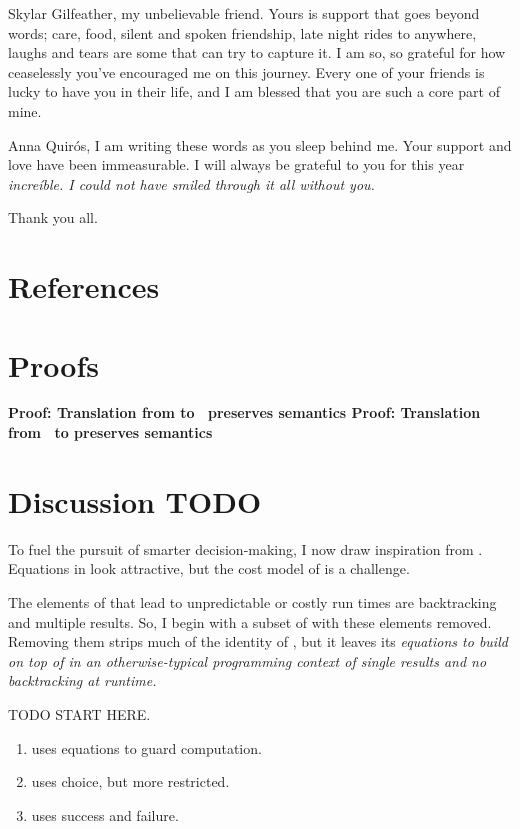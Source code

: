 \documentclass[manuscript,screen,review, 12pt, nonacm]{acmart}
\begin{document}
Skylar Gilfeather, my unbelievable friend. Yours is support that goes
beyond words; care, food, silent and spoken friendship, late night rides to
anywhere, laughs and tears are some that can try to capture it. I am so, so
grateful for how ceaselessly you've encouraged me on this journey. Every one
of your friends is lucky to have you in their life, and I am blessed that 
you are such a core part of mine. 

Anna Quirós, I am writing these words as you sleep behind me. Your support
and love have been immeasurable. I will always be grateful to you for this
year \it{increíble}. I could not have smiled through it all without you. 

Thank you all. 

\section{References}



\renewcommand\thesection{\Alph{section}}
\setcounter{section}{0}
\section{Proofs}
\begin{outline}
\1 \bf{Proof: Translation from \VMinus to \D\ preserves semantics }
\1 \bf{Proof: Translation from \PPlus\ to \VMinus preserves semantics }
\end{outline}

\section{Discussion TODO}
To fuel the pursuit of smarter decision-making, I now draw inspiration
from \VC. Equations in \VC look attractive, but the cost model of \VC is
a challenge. 

The elements of \VC that lead to unpredictable or costly run times are
backtracking and multiple results. So, I begin with a subset of \VC with
these elements removed. Removing them strips much of the identity of
\VC, but it leaves its \it{equations} to build on top of in an
otherwise-typical programming context of single results and no
backtracking at runtime. 

TODO START HERE. 

\begin{enumerate}
  \item \VMinus uses equations to guard computation. 
  \item \VMinus uses choice, but more restricted. 
  \item \VMinus uses success and failure. 
\end{enumerate}
\end{document}

